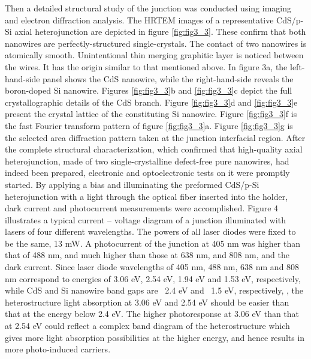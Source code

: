 Then a detailed structural study of the junction was conducted using imaging and electron diffraction analysis. The HRTEM images of a representative CdS/p-Si axial heterojunction are depicted in figure \ref{fig:fig3_3}. These confirm that both nanowires are perfectly-structured single-crystals. The contact of two nanowires is atomically smooth. Unintentional thin merging graphitic layer is noticed between the wires. It has the origin similar to that mentioned above. In figure 3a, the left-hand-side panel shows the CdS nanowire, while the right-hand-side reveals the boron-doped Si nanowire. Figures \ref{fig:fig3_3}b and \ref{fig:fig3_3}c depict the full crystallographic details of the CdS branch. Figure \ref{fig:fig3_3}d and \ref{fig:fig3_3}e present the crystal lattice of the constituting Si nanowire. Figure \ref{fig:fig3_3}f is the fast Fourier transform pattern of figure \ref{fig:fig3_3}a. Figure \ref{fig:fig3_3}g is the selected area diffraction pattern taken at the junction interfacial region. After the complete structural characterization, which confirmed that high-quality axial heterojunction, made of two single-crystalline defect-free pure nanowires, had indeed been prepared, electronic and optoelectronic tests on it were promptly started. 
By applying a bias and illuminating the preformed CdS/p-Si heterojunction with a light through the optical fiber inserted into the holder, dark current and photocurrent measurements were accomplished. Figure 4 illustrates a typical current – voltage diagram of a junction illuminated with lasers of four different wavelengths. The powers of all laser diodes were fixed to be the same, 13 mW. A photocurrent of the junction at 405 nm was higher than that of 488 nm, and much higher than those at 638 nm, and 808 nm, and the dark current. Since laser diode wavelengths of 405 nm, 488 nm, 638 nm and 808 nm correspond to energies of 3.06 eV, 2.54 eV, 1.94 eV and 1.53 eV, respectively, while CdS and Si nanowire band gaps are ~2.4 eV and ~1.5 eV, respectively, \cite{Fabbri2014}, the heterostructure light absorption at 3.06 eV and 2.54 eV should be easier than that at the energy below 2.4 eV. The higher photoresponse at 3.06 eV than that at 2.54 eV could reflect a complex band diagram of the heterostructure which gives more light absorption possibilities at the higher energy, and hence results in more photo-induced carriers. 



